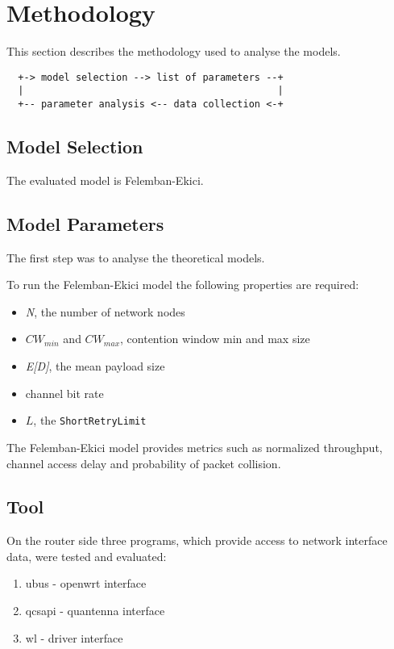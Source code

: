 \chapter{Methodology}

This section describes the methodology used to analyse the models.


\begin{verbatim}
  +-> model selection --> list of parameters --+
  |                                            |
  +-- parameter analysis <-- data collection <-+
\end{verbatim}
 
\section{Model Selection}

The evaluated model is Felemban-Ekici.

\section{Model Parameters}
The first step was to analyse the theoretical models.

To run the Felemban-Ekici model the following properties are required:

\begin{itemize}
	\item \emph{N}, the number of network nodes
	\item $CW_{min}$ and $CW_{max}$, contention window min and max size
	\item \emph{E[D]}, the mean payload size
	\item channel bit rate
	\item $L$, the \texttt{ShortRetryLimit}
\end{itemize}

The Felemban-Ekici model provides metrics such as normalized throughput, channel access delay and probability of packet collision.

\section{Tool}

On the router side three programs, which provide access to network interface data, were tested and evaluated:

\begin{enumerate}
	\item ubus - openwrt interface
	\item qcsapi - quantenna interface
	\item wl - driver interface
\end{enumerate}

